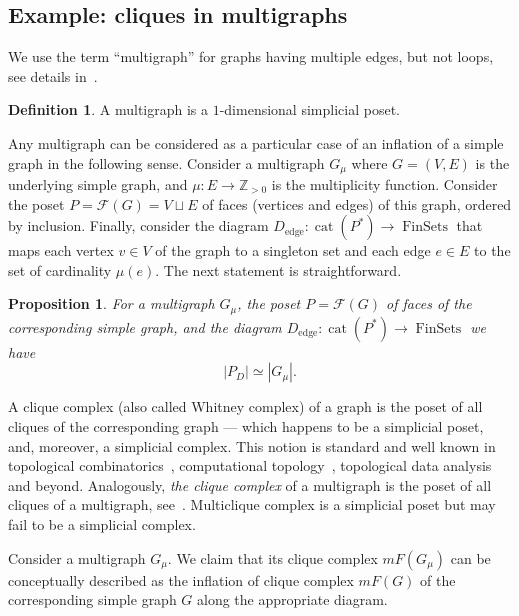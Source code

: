\documentclass[english,12pt,oneside]{amsproc}
\DeclareMathOperator{\cat}{cat}
\DeclareMathOperator{\FinSets}{FinSets}
\DeclareMathOperator{\edge}{edge}
\newcommand{\Zo}{\mathbb{Z}}
\newcommand{\ca}[1]{\mathcal{#1}}
\newcounter{stmcounter}[section]
\numberwithin{equation}{section}
\theoremstyle{plain}
\newtheorem{prop}[stmcounter]{Proposition}
\theoremstyle{definition}
\newtheorem{defin}[stmcounter]{Definition}
\theoremstyle{remark}
\begin{document}
\subsection{Example: cliques in multigraphs}

We use the term ``multigraph'' for graphs having multiple edges, but not loops, see details in~\cite{AyzRukh}.

\begin{defin}\label{definMultigraph}
A multigraph is a $1$-dimensional simplicial poset.
\end{defin}

Any multigraph can be considered as a particular case of an inflation of a simple graph in the following sense. Consider a multigraph $G_\mu$ where $G=(V,E)$ is the underlying simple graph, and $\mu\colon E\to \Zo_{>0}$ is the multiplicity function. Consider the poset $P = \ca{F}(G)=V\sqcup E$ of faces (vertices and edges) of this graph, ordered by inclusion. Finally, consider the diagram $D_{\edge}\colon \cat(P^*)\to \FinSets$ that maps each vertex $v\in V$ of the graph to a singleton set and each edge $e\in E$ to the set of cardinality $\mu(e)$. The next statement is straightforward.

\begin{prop}\label{multigraph}
    For a multigraph $G_\mu$, the poset $P = \ca{F}(G)$ of faces of the corresponding simple graph, and the diagram $D_{\edge}\colon \cat(P^*)\to \FinSets$ we have
    \begin{equation}
        |P_D|\simeq |G_\mu|.
    \end{equation}
\end{prop}

A clique complex (also called Whitney complex) of a graph is the poset of all cliques of the corresponding graph --- which happens to be a simplicial poset, and, moreover, a simplicial complex. This notion is standard and well known in topological combinatorics~\cite[Def.9.1]{Kozlov}, computational topology~\cite{CriKol}, topological data analysis~\cite[Def.2.16]{DeiWang} and beyond. Analogously, \emph{the clique complex} of a multigraph is the poset of all cliques of a multigraph, see~\cite{AyzRukh}. Multiclique complex is a simplicial poset but may fail to be a simplicial complex.

Consider a multigraph $G_\mu$. We claim that its clique complex $mF(G_\mu)$ can be conceptually described as the inflation of clique complex $mF(G)$ of the corresponding simple graph $G$ along the appropriate diagram.
\end{document}
